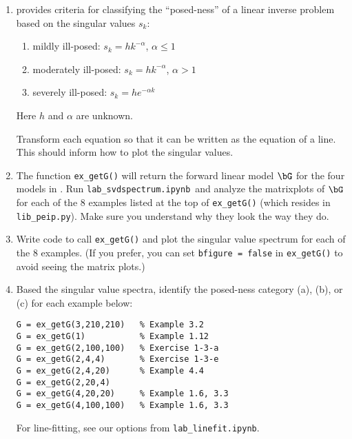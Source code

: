 \documentclass[11pt,titlepage,fleqn]{article}
\newcommand{\tfile}{{\tt lab\_svdspectrum.ipynb}}
\begin{document}
\begin{enumerate}

\item \citet[][Section~3.5, p.~74]{Aster} provides criteria for classifying the ``posed-ness'' of a linear inverse problem based on the singular values $s_k$:
%
\begin{enumerate}
\renewcommand{\theenumi}{\Alph{enumi}}
\item mildly ill-posed: $s_k = h k^{-\alpha}$, $\alpha \le 1$
\item moderately ill-posed: $s_k = h k^{-\alpha}$, $\alpha > 1$
\item severely ill-posed: $s_k = h e^{-\alpha k}$
\end{enumerate}
%
Here $h$ and $\alpha$ are unknown.

Transform each equation so that it can be written as the equation of a line. This should inform how to plot the singular values.

\item The function \verb+ex_getG()+ will return the forward linear model $\bG$ for the four models in \citet{Aster}. Run \tfile\ and analyze the matrixplots of $\bG$ for each of the 8 examples listed at the top of \verb+ex_getG()+ (which resides in \verb+lib_peip.py+). Make sure you understand why they look the way they do.

\item Write code to call \verb+ex_getG()+ and plot the singular value spectrum for each of the 8 examples. (If you prefer, you can set \verb+bfigure = false+ in \verb+ex_getG()+ to avoid seeing the matrix plots.)

\pagebreak
\item Based the singular value spectra, identify the posed-ness category (a), (b), or (c) for each example below:
%
\begin{spacing}{1.5}
\begin{verbatim}
G = ex_getG(3,210,210)   % Example 3.2
G = ex_getG(1)           % Example 1.12
G = ex_getG(2,100,100)   % Exercise 1-3-a
G = ex_getG(2,4,4)       % Exercise 1-3-e
G = ex_getG(2,4,20)      % Example 4.4
G = ex_getG(2,20,4)
G = ex_getG(4,20,20)     % Example 1.6, 3.3
G = ex_getG(4,100,100)   % Example 1.6, 3.3
\end{verbatim}
\end{spacing}
%
For line-fitting, see our options from \verb+lab_linefit.ipynb+.

\end{enumerate}


\end{document}
